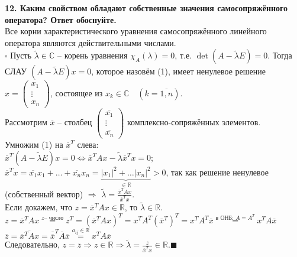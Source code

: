 \documentclass[11pt,a4paper]{article}
\newcommand{\R}{\mathbb{R}}
\renewcommand{\C}{\mathbb{C}}
\newcommand{\proof}{$\square$ }
\newcommand{\qed}{\hfill$\blacksquare$}
\begin{document}
\textbf{12. Каким свойством обладают собственные значения самосопряжённого оператора? Ответ обоснуйте.\\}
Все корни характеристического уравнения самосопряжённого линейного оператора являются действительными числами.\\
\proof Пусть $\tilde{\lambda} \in \C$ -- корень уравнения $\chi_A ( \lambda ) = 0$, т.е. $\det(A - \tilde{\lambda} E) = 0$. Тогда СЛАУ $(A - \tilde{\lambda} E) x = 0$, которое назовём (1), имеет ненулевое решение $x = \left( \begin{matrix}
x_1 \\
\vdots \\
x_n
\end{matrix} \right)$, состоящее из $x_k \in \C \quad (k = \overline{1, n})$.\\
Рассмотрим $\overline{x}$ -- столбец
$\left( \begin{matrix}
\overline{x_1} \\
\vdots \\
\overline{x_n}
\end{matrix} \right)$ комплексно-сопряжённых элементов.\\
Умножим (1) на $\overline{x}^T$ слева:\\
$\overline{x}^T (A - \tilde{\lambda} E) x = 0 \Leftrightarrow \overline{x}^T A x - \tilde{\lambda} \overline{x}^T x = 0$; $\overline{x}^T x = \overline{x_1} x_1 + \hdots + \overline{x_n} x_n = \underbrace{|x_1|^2 + \hdots |x_n|^2}_{\in \R} > 0$, так как решение ненулевое (собственный вектор) $\Rightarrow$ $\tilde{\lambda} = \frac{\overline{x}^T A x}{\overline{x}^T x}$.\\
Если докажем, что $z = \overline{x}^T A x \in \R$, то $\tilde{\lambda} \in \R$.\\
$z = \overline{x}^T A x \stackrel{z \text{-- число}}{=} z^T = (\overline{x}^T A x)^T = x^T A^T (\overline{x}^T)^T = x^T A^T \overline{x} \stackrel{\text{в ОНБ: } A = A^T}{=} x^T A \overline{x}$\\
$\overline{z} = \overline{\overline{x}^T A x} = \overline{\overline{x}}^T \overline{A} \overline{x} \stackrel{a_{ij} \in \R}{=} x^T A \overline{x}$\\
Следовательно, $z = \overline{z} \Rightarrow z \in \R \Rightarrow \tilde{\lambda} = \frac{z}{\overline{x}^T x} \in \R$.\qed
\end{document}
